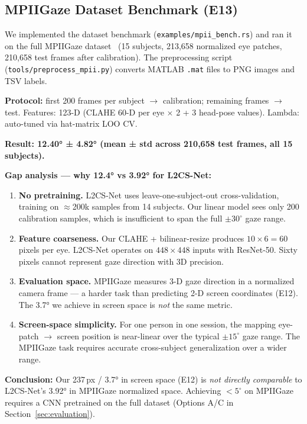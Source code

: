 \documentclass[11pt,a4paper]{article}
\begin{document}
\subsection{MPIIGaze Dataset Benchmark (E13)}

We implemented the dataset benchmark (\texttt{examples/mpii\_bench.rs}) and ran it on the full MPIIGaze dataset~\cite{zhang2019mpiigaze} (15 subjects, 213,658 normalized eye patches, 210,658 test frames after calibration).
The preprocessing script (\texttt{tools/preprocess\_mpii.py}) converts MATLAB \texttt{.mat} files to PNG images and TSV labels.

\textbf{Protocol:} first 200 frames per subject $\to$ calibration; remaining frames $\to$ test.
Features: 123-D (CLAHE 60-D per eye $\times$ 2 + 3 head-pose values).
Lambda: auto-tuned via hat-matrix LOO CV.

\textbf{Result: 12.40° ± 4.82° (mean ± std across 210,658 test frames, all 15 subjects).}

\textbf{Gap analysis — why 12.4° vs 3.92° for L2CS-Net:}

\begin{enumerate}
  \item \textbf{No pretraining.} L2CS-Net uses leave-one-subject-out cross-validation,
    training on $\approx$200k samples from 14 subjects. Our linear model sees only 200
    calibration samples, which is insufficient to span the full $\pm 30^\circ$ gaze range.
  \item \textbf{Feature coarseness.} Our CLAHE + bilinear-resize produces $10\times6 = 60$
    pixels per eye. L2CS-Net operates on $448\times448$ inputs with ResNet-50.
    Sixty pixels cannot represent gaze direction with 3D precision.
  \item \textbf{Evaluation space.} MPIIGaze measures 3-D gaze direction in a normalized
    camera frame — a harder task than predicting 2-D screen coordinates (E12).
    The 3.7° we achieve in screen space is \emph{not} the same metric.
  \item \textbf{Screen-space simplicity.} For one person in one session, the mapping
    eye-patch $\to$ screen position is near-linear over the typical $\pm15^\circ$ gaze range.
    The MPIIGaze task requires accurate cross-subject generalization over a wider range.
\end{enumerate}

\textbf{Conclusion:} Our 237\,px / 3.7° in screen space (E12) is \emph{not directly comparable}
to L2CS-Net's 3.92° in MPIIGaze normalized space.
Achieving $<5^\circ$ on MPIIGaze requires a CNN pretrained on the full dataset
(Options A/C in Section~\ref{sec:evaluation}).
\end{document}
